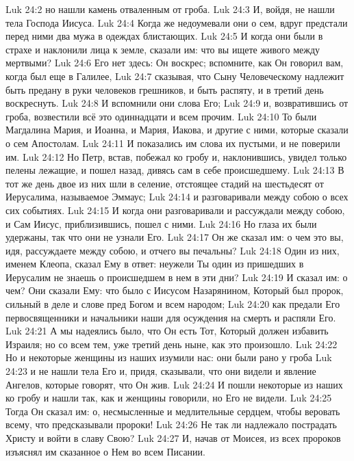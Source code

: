 \vs Luk 24:2 но нашли камень отваленным от гроба.
\vs Luk 24:3 И, войдя, не нашли тела Господа Иисуса.
\vs Luk 24:4 Когда же недоумевали они о сем, вдруг предстали перед ними два мужа в одеждах блистающих.
\vs Luk 24:5 И когда они были в страхе и наклонили лица  к земле, сказали им: что вы ищете живого между мертвыми?
\vs Luk 24:6 Его нет здесь: Он воскрес; вспомните, как Он говорил вам, когда был еще в Галилее,
\vs Luk 24:7 сказывая, что Сыну Человеческому надлежит быть предану в руки человеков грешников, и быть распяту, и в третий день воскреснуть.
\vs Luk 24:8 И вспомнили они слова Его;
\vs Luk 24:9 и, возвратившись от гроба, возвестили всё это одиннадцати и всем прочим.
\vs Luk 24:10 То были Магдалина Мария, и Иоанна, и Мария,  Иакова, и другие с ними, которые сказали о сем Апостолам.
\vs Luk 24:11 И показались им слова их пустыми, и не поверили им.
\vs Luk 24:12 Но Петр, встав, побежал ко гробу и, наклонившись, увидел только пелены лежащие, и пошел назад, дивясь сам в себе происшедшему.
\rsbpar\vs Luk 24:13 В тот же день двое из них шли в селение, отстоящее стадий на шестьдесят от Иерусалима, называемое Эммаус;
\vs Luk 24:14 и разговаривали между собою о всех сих событиях.
\vs Luk 24:15 И когда они разговаривали и рассуждали между собою, и Сам Иисус, приблизившись, пошел с ними.
\vs Luk 24:16 Но глаза их были удержаны, так что они не узнали Его.
\vs Luk 24:17 Он же сказал им: о чем это вы, идя, рассуждаете между собою, и отчего вы печальны?
\vs Luk 24:18 Один из них, именем Клеопа, сказал Ему в ответ: неужели Ты один из пришедших в Иерусалим не знаешь о происшедшем в нем в эти дни?
\vs Luk 24:19 И сказал им: о чем? Они сказали Ему: что было с Иисусом Назарянином, Который был пророк, сильный в деле и слове пред Богом и всем народом;
\vs Luk 24:20 как предали Его первосвященники и начальники наши для осуждения на смерть и распяли Его.
\vs Luk 24:21 А мы надеялись было, что Он есть Тот, Который должен избавить Израиля; но со всем тем, уже третий день ныне, как это произошло.
\vs Luk 24:22 Но и некоторые женщины из наших изумили нас: они были рано у гроба
\vs Luk 24:23 и не нашли тела Его и, придя, сказывали, что они видели и явление Ангелов, которые говорят, что Он жив.
\vs Luk 24:24 И пошли некоторые из наших ко гробу и нашли так, как и женщины говорили, но Его не видели.
\vs Luk 24:25 Тогда Он сказал им: о, несмысленные и медлительные сердцем, чтобы веровать всему, что предсказывали пророки!
\vs Luk 24:26 Не так ли надлежало пострадать Христу и войти в славу Свою?
\vs Luk 24:27 И, начав от Моисея, из всех пророков изъяснял им сказанное о Нем во всем Писании.

